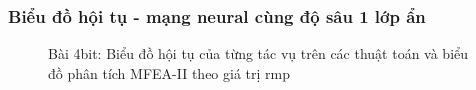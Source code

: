 \subsubsection{Biểu đồ hội tụ - mạng neural cùng độ sâu 1 lớp ẩn}
\begin{figure}[H]
    \centering

    \label{fig:4bit_1layer}
    \caption{Bài 4bit: Biểu đồ hội tụ của từng tác vụ trên các thuật toán và biểu đồ phân tích MFEA-II theo giá trị rmp}

\end{figure}
